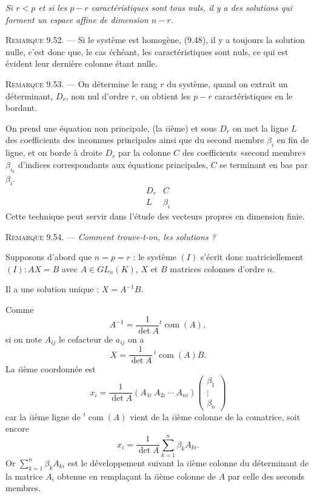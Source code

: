 \emph{Si $r<p$ et si les $p-r$ caractéristiques sont tous nuls, il y a des solutions qui forment un espace affine de dimension $n-r$.}

\medskip\noindent\textsc{Remarque 9.52.} --- Si le système est homogène, (9.48), il y a toujours la solution nulle, c'est donc que, le cas échéant, les caractéristiques sont nuls, ce qui est évident leur dernière colonne étant nulle.

\medskip\noindent\textsc{Remarque 9.53.} --- On détermine le rang $r$ du système, quand on extrait un déterminant, $D_r$, non nul d'ordre $r$, on obtient les $p-r$ caractéristiques en le bordant.

On prend une équation non principale, (la $i$ième) et sous $D_r$ on met la ligne $L$ des coefficients des inconnues principales ainsi que du second membre $\beta_i$ en fin de ligne, et on borde à droite $D_r$ par la colonne $C$ des coefficients «second membre» $\beta_{i_k}$ d'indices correspondants aux équations principales, $C$ se terminant en bas par $\beta_i$.
\[
\begin{array}{c|c}
D_r&C\\\hline
L&\beta_i
\end{array}
\]
Cette technique peut servir  dans l'étude des vecteurs propres en dimension finie.

\medskip\noindent\textsc{Remarque 9.54.} --- \emph{Comment trouve-t-on, les solutions ?}

Supposons d'abord que $n=p=r$ : le système $(I)$ s'écrit donc matriciellement $(I):AX=B$ avec $A\in GL_n(K)$, $X$ et $B$ matrices colonnes d'ordre $n$.

Il a une solution unique : $X=A^{-1}B$.

Comme
\[
A^{-1}=\frac1{\det A}{}^t\!\operatorname{com}(A),
\]
si on note $A_{ij}$ le cofacteur de $a_{ij}$ on a
\[
X=\frac1{\det A}\,{}^t\!\operatorname{com}(A)B.
\]
La $i$ième coordonnée est
\[
x_i=\frac1{\det A}(A_{1i}\ A_{2i}\ \cdots\ A_{ni})
\begin{pmatrix}\beta_1\\\vdots\\\beta_n\end{pmatrix}
\]
car la $i$ième ligne de ${}^t\!\operatorname{com}(A)$ vient de la $i$ième colonne de la comatrice, soit encore
\[
x_i=\frac1{\det A}\sum_{k=1}^n\beta_kA_{ki}.
\]
Or $\sum_{k=1}^n\beta_kA_{ki}$ est le développement suivant la $i$ième colonne du déterminant de la matrice $A_i$ obtenue en remplaçant la $i$ième colonne de $A$ par celle des seconds membres.


